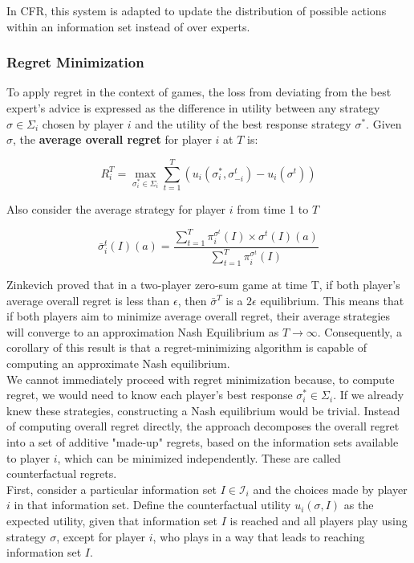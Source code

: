 \documentclass{article}
\begin{document}
In CFR, this system is adapted to update the distribution of possible actions within an information set instead of over experts.



\subsubsection{Regret Minimization}
To apply regret in the context of games, the loss from deviating from the best expert's advice is expressed as the difference in utility between any strategy \( \sigma \in \Sigma_i \) chosen by player \( i \) and the utility of the best response strategy \( \sigma^* \). Given $\sigma$, the \textbf{average overall regret} for player $i$ at  $T$ is:

\[ R^T_i = \max_{\sigma^*_i \in \Sigma_i} \sum_{t=1}^T (u_i(\sigma^*_i, \sigma_{-i}^t) - u_i(\sigma^t)) \]

Also consider the average strategy for player $i$ from time 1 to $T$

\[ \bar\sigma^t_i (I)(a) = \frac
{\sum_{t=1}^T \pi_i^{\sigma^t}(I) \times  \sigma^t (I)(a)} 
{\sum_{t=1}^T \pi_i^{\sigma^t}(I)} \]

Zinkevich proved that in a two-player zero-sum game at time T, if both player's average overall regret is less than $\epsilon$, then $\bar\sigma^T$ is a $2 \epsilon$ equilibrium. This means that if both players aim to minimize average overall regret, their average strategies will converge to an approximation Nash Equilibrium as $T \to \infty$. Consequently, a corollary of this result is that a regret-minimizing algorithm is capable of computing an approximate Nash equilibrium.\\


We cannot immediately proceed with regret minimization because, to compute regret, we would need to know each player's best response \( \sigma^*_i \in \Sigma_i \). If we already knew these strategies, constructing a Nash equilibrium would be trivial. Instead of computing overall regret directly, the approach decomposes the overall regret into a set of additive "made-up" regrets, based on the information sets available to player \( i \), which can be minimized independently. These are called counterfactual regrets. \\

First, consider a particular information set \( I \in \mathcal{I}_i \) and the choices made by player \( i \) in that information set. Define the counterfactual utility \( u_i(\sigma, I) \) as the expected utility, given that information set \( I \) is reached and all players play using strategy \( \sigma \), except for player \( i \), who plays in a way that leads to reaching information set \( I \). \\
\end{document}
